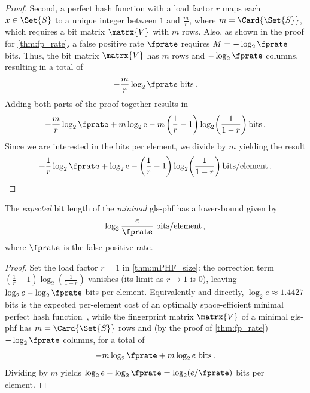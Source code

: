 \documentclass[ ../main.tex]{subfiles}
\begin{document}
\begin{proof}
Second, a perfect hash function with a load factor $r$ maps each $x \in \Set{S}$ to a unique integer between $1$ and $\frac{m}{r}$, where $m=\Card{\Set{S}}$, which requires a bit matrix $\matrx{V}$ with $m$ rows. Also, as shown in the proof for \cref{thm:fp_rate}, a false positive rate $\fprate$ requires $M = -\log_2 \fprate$ bits. Thus, the bit matrix $\matrx{V}$ has $m$ rows and $-\log_2 \fprate$ columns, resulting in a total of
\begin{equation}
    -\frac{m}{r} \log_2 \fprate \; \si{bits}\,.
\end{equation}
Adding both parts of the proof together results in
\begin{equation}
    -\frac{m}{r} \log_2 \fprate + m \log_2 \mathrm{e} - m \left(\frac{1}{r} - 1\right) \log_2\!\left(\frac{1}{1-r}\right) \si{bits}\,.
\end{equation}
Since we are interested in the bits per element, we divide by $m$ yielding the result
\begin{equation}
    -\frac{1}{r} \log_2 \fprate + \log_2 \mathrm{e} -  \left(\frac{1}{r} - 1\right) \log_2\!\left(\frac{1}{1-r}\right) \si{bits \per element}\,.
\end{equation}
\end{proof}

\begin{corollary}
\label{cor:mPHF_size}
The \emph{expected} bit length of the \emph{minimal} \gls{gls-phf} has a lower-bound given by
\begin{equation}
    \log_2 \frac{e}{\fprate} \; \si{bits \per element}\,,
\end{equation}
where $\fprate$ is the false positive rate.
\end{corollary}
\begin{proof}
Set the load factor $r = 1$ in \cref{thm:mPHF_size}: the correction term $\left(\frac{1}{r}-1\right)\log_2\!\left(\frac{1}{1-r}\right)$ vanishes (its limit as $r \to 1$ is $0$), leaving $\log_2 e - \log_2 \fprate$ bits per element. Equivalently and directly, $\log_2 e \approx \num{1.4427}$ bits is the expected per-element cost of an optimally space-efficient minimal perfect hash function~\cite{mehlhorn1982}, while the fingerprint matrix $\matrx{V}$ of a minimal \gls{gls-phf} has $m = \Card{\Set{S}}$ rows and (by the proof of \cref{thm:fp_rate}) $-\log_2 \fprate$ columns, for a total of
\begin{equation}
    -m \log_2 \fprate + m \log_2 e\; \si{bits}\,.
\end{equation}
Dividing by $m$ yields $\log_2 e - \log_2 \fprate = \log_2(e/\fprate)$ bits per element.
\end{proof}
\end{document}
